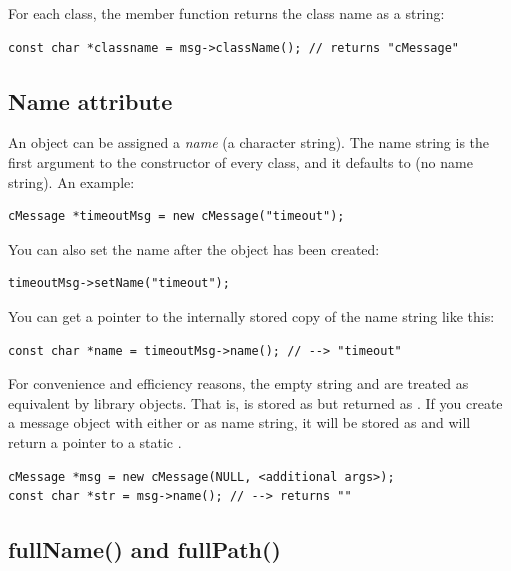 For each class, the  member function returns the class
name as a string:

\begin{verbatim}
const char *classname = msg->className(); // returns "cMessage"
\end{verbatim}


\subsection{Name attribute}
\label{sec:sim-lib:name}

An object can be assigned a \textit{name} (a character string). The name
string is the first argument to the constructor of every class,
and it defaults to  (no name string). An example:

\begin{verbatim}
cMessage *timeoutMsg = new cMessage("timeout");
\end{verbatim}

You can also set the name after the object has been created:

\begin{verbatim}
timeoutMsg->setName("timeout");
\end{verbatim}

You can get a pointer to the internally stored copy of the name
string like this:

\begin{verbatim}
const char *name = timeoutMsg->name(); // --> "timeout"
\end{verbatim}

For convenience and efficiency reasons, the empty string 
and  are treated as equivalent by library objects.
That is,  is stored as  but returned as .
If you create a message object with either 
or  as name string, it will be stored as 
and  will return a pointer to a static .

\begin{verbatim}
cMessage *msg = new cMessage(NULL, <additional args>);
const char *str = msg->name(); // --> returns ""
\end{verbatim}


\subsection{fullName() and fullPath()}
\label{sec:sim-lib:fullname-and-fullpath}


